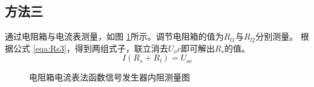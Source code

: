 \documentclass[a4paper,11pt,UTF8]{ctexart}
\begin{document}
\subsection{方法三}
通过电阻箱与电流表测量，如图 \ref{fig:FunR4}所示。调节电阻箱的值为$R_{l1}$与$R_{l2}$分别测量。
根据公式 \ref{eqa:Rs3}，得到两组式子，联立消去$U_oc$即可解出$R_s$的值。
\begin{equation}
  I\left(R_s+R_l\right)=U_{oc}
\label{eqa:Rs3}
\end{equation}
    
\begin{figure}[htbp]
  \centering
  \caption{电阻箱电流表法函数信号发生器内阻测量图}
  \label{fig:FunR4}
  \end{figure}
  
\end{document}
